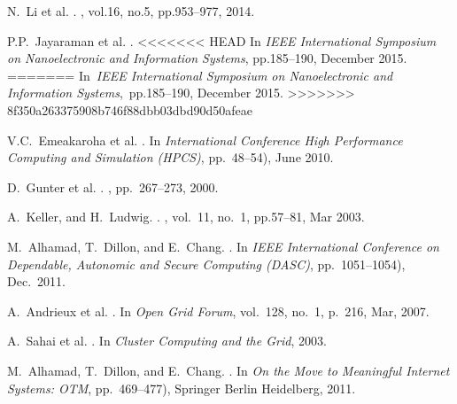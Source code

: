 \begin{thebibliography}{10}
N.~Li et al.
.
, vol.16, no.5, pp.953--977, 2014.

P.P.~Jayaraman et al.
.
<<<<<<< HEAD
\newblock In {\em IEEE International Symposium on Nanoelectronic and Information Systems}, pp.185--190, December 2015.
=======
\newblock In {\em IEEE International Symposium on Nanoelectronic and Information Systems}, pp.185--190, December 2015.
>>>>>>> 8f350a263375908b746f88dbb03dbd90d50afeae

V.C.~Emeakaroha et al.
.
\newblock In {\em International Conference High Performance Computing and Simulation (HPCS)}, pp.~48--54), June 2010.

D.~Gunter et al.
.
, pp.~267--273, 2000.

A.~Keller, and H.~Ludwig.
.
, vol.~11, no.~1, pp.57--81, Mar 2003.

M.~Alhamad, T.~Dillon, and E.~Chang.
.
\newblock In {\em IEEE International Conference on Dependable, Autonomic and Secure Computing (DASC)}, pp.~1051--1054), Dec.~2011.

A.~Andrieux et al.
.
\newblock In {\em Open Grid Forum}, vol.~128, no.~1, p.~216, Mar, 2007.

A.~Sahai et al.
.
\newblock In {\em Cluster Computing and the Grid}, 2003.

M.~Alhamad, T.~Dillon, and E.~Chang.
.
\newblock In {\em On the Move to Meaningful Internet Systems: OTM}, pp.~469--477), Springer Berlin Heidelberg, 2011.


\end{thebibliography}
